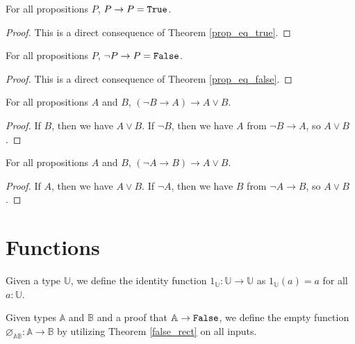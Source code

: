 \documentclass[../math.tex]{subfiles}
\begin{document}
\begin{theorem} \label{prop_is_true}
    For all propositions $P$, $P \to P = \verb|True|$.
\end{theorem}
\begin{proof}
    This is a direct consequence of Theorem \ref{prop_eq_true}.
\end{proof}

\begin{theorem} \label{prop_is_false}
    For all propositions $P$, $\neg P \to P = \verb|False|$.
\end{theorem}
\begin{proof}
    This is a direct consequence of Theorem \ref{prop_eq_false}.
\end{proof}

\begin{theorem} \label{or_left}
    For all propositions $A$ and $B$, $(\neg B \to A) \to A \vee B$.
\end{theorem}
\begin{proof}
    If $B$, then we have $A \vee B$.  If $\neg B$, then we have $A$ from $\neg B
    \to A$, so $A \vee B$.
\end{proof}

\begin{theorem} \label{or_right}
    For all propositions $A$ and $B$, $(\neg A \to B) \to A \vee B$.
\end{theorem}
\begin{proof}
    If $A$, then we have $A \vee B$.  If $\neg A$, then we have $B$ from $\neg A
    \to B$, so $A \vee B$.
\end{proof}

\section{Functions}

\begin{definition}
    Given a type $\mathbb U$, we define the identity function $1_\mathbb U :
    \mathbb U \rightarrow \mathbb U$ as $1_\mathbb U(a) = a$ for all $a :
    \mathbb U$.
\end{definition}

\begin{definition}
    Given types $\mathbb A$ and $\mathbb B$ and a proof that $\mathbb A
    \rightarrow \vtt{False}$, we define the empty function $\varnothing_{\mathbb
    A \mathbb B} : \mathbb A \rightarrow \mathbb B$ by utilizing Theorem
    \ref{false_rect} on all inputs.
\end{definition}
\end{document}
